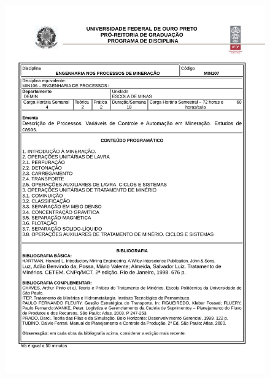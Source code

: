 \begin{figure}[p]
	\centering 
	\includegraphics[scale=0.7]{capitulos/anexo1-programas-disciplina/p95.pdf}
\end{figure}

